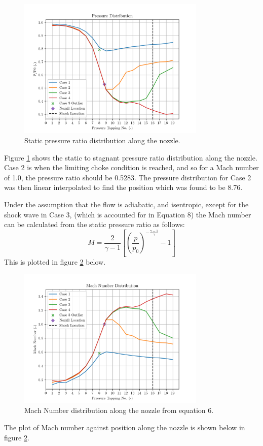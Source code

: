 \documentclass[8pt]{article}
\begin{document}
\begin{figure}[H]
    \centering
    \includegraphics[width=0.8\textwidth]{pressure_ratio_distribution_corrected.png}
    \caption{Static pressure ratio distribution along the nozzle.}
    \label{fig:figure4}
\end{figure}

Figure \ref{fig:figure4} shows the static to stagnant pressure ratio distribution along the nozzle.
Case 2 is when the limiting choke condition is reached, and so for a Mach number of 1.0, the pressure ratio should be 0.5283.
The pressure distribution for Case 2 was then linear interpolated to find the position which was found to be 8.76.

\hfill

Under the assumption that the flow is adiabatic, and isentropic, except for the shock wave in Case 3, (which is accounted for in Equation 8) the Mach number can be calculated from the static pressure ratio as follows:
\begin{equation}
    M = \frac{2}{\gamma - 1} \left[ \left( \frac{p}{p_0} \right) ^ {-\frac{\gamma - 1}{\gamma}} - 1 \right]
\end{equation}
This is plotted in figure \ref{fig:figure5} below.

\begin{figure}[H]
    \centering
    \includegraphics[width=0.8\textwidth]{mach_number_distribution_corrected.png}
    \caption{Mach Number distribution along the nozzle from equation 6.}
    \label{fig:figure5}
\end{figure}
The plot of Mach number against position along the nozzle is shown below in figure \ref{fig:figure5}.
\end{document}
